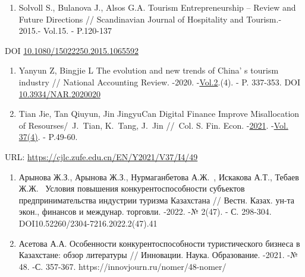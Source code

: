 \begin{references}

\begin{enumerate}
\def\labelenumi{\arabic{enumi}.}
\item
  Solvoll S., Bulanova J., Alsos G.A. Tourism Entrepreneurship -- Review
  and Future Directions // Scandinavian Journal of Hospitality and
  Tourism.- 2015.- Vol.15. - P.120-137
\end{enumerate}

DOI
\href{http://dx.doi.org/10.1080/15022250.2015.1065592}{10.1080/15022250.2015.1065592}

\begin{enumerate}
\def\labelenumi{\arabic{enumi}.}
\setcounter{enumi}{1}
\item
  Yanyun Z, Bingjie L The evolution and new trends of
  China' s tourism industry // National Accounting
  Review. -2020.
  -\href{https://www.aimspress.com/nar/article/archives}{Vol.2}.(4). -
  P. 337-353. DOI
  \href{https://doi.org/10.3934/NAR.2020020}{10.3934/NAR.2020020}
\item
  Tian Jie, Tan Qiuyun, Jin JingyuCan Digital Finance Improve
  Misallocation of Resourses/~J.~Tian, K.~Tang, J.~Jin //~Col. S. Fin.
  Econ.
  -\href{https://cjlc.zufe.edu.cn/EN/article/showTenYearVolumnDetail.do?nian=2021}{2021}.
  -\href{https://cjlc.zufe.edu.cn/EN/article/showTenYearVolumnDetail.do?nian=2021}{Vol.
  37}\href{file:///C:/Users/admin/Desktop/Вестник\%20КазУТБ/4\%202024/(4)}{(4)}.
  - P.49-60.
\end{enumerate}

URL: \url{https://cjlc.zufe.edu.cn/EN/Y2021/V37/I4/49}

\begin{enumerate}
\def\labelenumi{\arabic{enumi}.}
\setcounter{enumi}{3}
\item
  Арынова Ж.З., Арынова Ж.З., Нурмаганбетова А.Ж.~, Искакова А.Т.,
  Тебаев Ж.Ж.~ Условия повышения конкурентоспособности субъектов
  предпринимательства индустрии туризма Казахстана // Вестн. Казах.
  ун-та экон., финансов и междунар. торговли. -2022. -№ 2(47). - С.
  298-304. DOI10.52260/2304-7216.2022.2(47).41
\item
  Асетова А.А. Особенности конкурентоспособности туристического бизнеса
  в Казахстане: обзор литературы // Инновации. Наука. Образование.
  -2021. -№ 48. -С. 357-367.   https://innovjourn.ru/nomer/48-nomer/
\end{enumerate}


\end{references}
